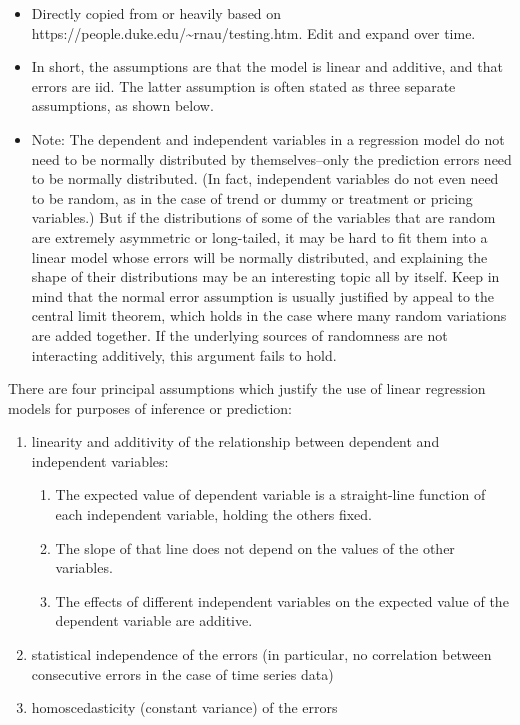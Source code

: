 \documentclass[
  letterpaper,
  DIV=11,
  numbers=noendperiod]{scrreprt}
\begin{document}
\begin{itemize}
\item
  Directly copied from or heavily based on
  https://people.duke.edu/\textasciitilde rnau/testing.htm. Edit and
  expand over time.
\item
  In short, the assumptions are that the model is linear and additive,
  and that errors are iid. The latter assumption is often stated as
  three separate assumptions, as shown below.
\item
  Note: The dependent and independent variables in a regression model do
  not need to be normally distributed by themselves--only the prediction
  errors need to be normally distributed. (In fact, independent
  variables do not even need to be random, as in the case of trend or
  dummy or treatment or pricing variables.) But if the distributions of
  some of the variables that are random are extremely asymmetric or
  long-tailed, it may be hard to fit them into a linear model whose
  errors will be normally distributed, and explaining the shape of their
  distributions may be an interesting topic all by itself. Keep in mind
  that the normal error assumption is usually justified by appeal to the
  central limit theorem, which holds in the case where many random
  variations are added together. If the underlying sources of randomness
  are not interacting additively, this argument fails to hold.
\end{itemize}

There are four principal assumptions which justify the use of linear
regression models for purposes of inference or prediction:

\begin{enumerate}
\def\labelenumi{(\roman{enumi})}
\item
  linearity and additivity of the relationship between dependent and
  independent variables:

  \begin{enumerate}
  \def\labelenumii{(\alph{enumii})}
  \item
    The expected value of dependent variable is a straight-line function
    of each independent variable, holding the others fixed.
  \item
    The slope of that line does not depend on the values of the other
    variables.
  \item
    The effects of different independent variables on the expected value
    of the dependent variable are additive.
  \end{enumerate}
\item
  statistical independence of the errors (in particular, no correlation
  between consecutive errors in the case of time series data)
\item
  homoscedasticity (constant variance) of the errors
\end{enumerate}
\end{document}
